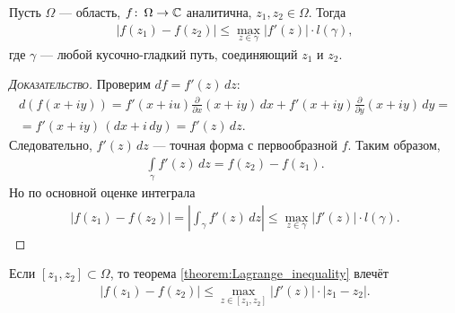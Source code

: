 \begin{thm}
 \label{theorem:Lagrange_inequality}
 Пусть $ \Omega $ --- область, $ f \colon\, \Omega \to \mathbb{C} $ аналитична, $ z_1, z_2 \in \Omega $. Тогда
 \begin{align*}
  \left| f(z_1) - f(z_2) \right| \leqslant \max_{z \in \gamma} \left| f'(z) \right| \cdot l(\gamma),
 \end{align*} где $ \gamma $ --- любой кусочно-гладкий путь, соединяющий $ z_1 $ и $ z_2 $.
\end{thm}
\begin{proof}[\normalfont\textsc{Доказательство}]
 Проверим $ df = f'(z) \, dz$:
 \begin{align*}
  d(f(x+iy)) = f'(x+iu) \frac{\partial}{\partial x}(x+iy)\,dx + f'(x +iy) \frac{\partial}{\partial y}(x+iy)\,dy = \\
  =f'(x+iy)\,(dx + i\,dy) = f'(z)\,dz.
 \end{align*} Следовательно, $ f'(z)\,dz $ --- точная форма с первообразной $ f $. Таким образом,
 \begin{align*}
  \int\limits_{\gamma}  f'(z)\,dz = f(z_2) - f(z_1).
 \end{align*} Но по основной оценке интеграла
 \begin{align*}
  \left| f(z_1) - f(z_2) \right| = \left| \int_{\gamma} f'(z)\,dz   \right| \leqslant \max_{z \in \gamma} \left| f'(z) \right| \cdot l(\gamma).
 \end{align*} 
\end{proof}
\begin{remrk}
  Если $ [z_1, z_2] \subset \Omega $, то теорема \eqref{theorem:Lagrange_inequality} влечёт\
 \begin{align*}
  \left| f(z_1) - f(z_2) \right| \leqslant \max_{z \in [z_1, z_2]} \left| f'(z) \right| \cdot \left| z_1 - z_2 \right|.
 \end{align*} 
\end{remrk}


